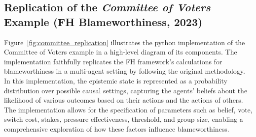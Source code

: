 \documentclass{article}
\begin{document}
\subsection{Replication of the \textit{Committee of Voters} Example \small (FH Blameworthiness, 2023)}\label{sec:replication}


Figure~\ref{fig:committee_replication} illustrates the python implementation of the Committee of Voters example in a high-level diagram of its components. The implementation faithfully replicates the FH framework's calculations for blameworthiness in a multi-agent setting by following the original methodology. In this implementation, the epistemic state is represented as a probability distribution over possible causal settings, capturing the agents' beliefs about the likelihood of various outcomes based on their actions and the actions of others. The implementation allows for the specification of parameters such as belief, vote, switch cost, stakes, pressure effectiveness, threshold, and group size, enabling a comprehensive exploration of how these factors influence blameworthiness. 
\end{document}
